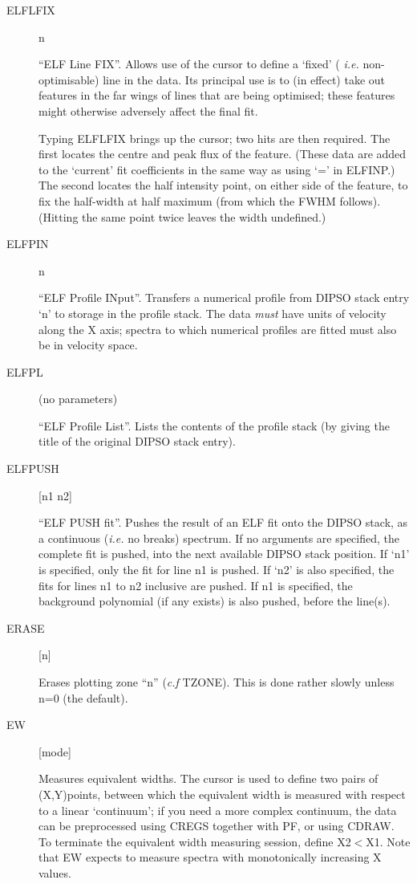 \begin {description}
\item [ELFLFIX] n

``ELF Line FIX''. Allows use of the cursor to define a `fixed' ({\em
i.e.} non-optimisable) line in the data. Its principal use is to (in
effect) take out features in the far wings of lines that are being
optimised; these features might otherwise adversely affect the final
fit.

Typing ELFLFIX brings up the cursor; two hits are then required. The
first locates the centre and peak flux of the feature. (These data are
added to the `current' fit coefficients in the same way as using `='
in ELFINP.) The second locates the half intensity point, on either
side of the feature, to fix the half-width at half maximum (from which
the FWHM follows). (Hitting the same point twice leaves the width
undefined.)

\item [ELFPIN] n

``ELF Profile INput''. Transfers a numerical profile from DIPSO stack
entry `n' to storage in the profile stack. The data {\em must} have
units of velocity along the X axis; spectra to which numerical
profiles are fitted must also be in velocity space.

\item [ELFPL] (no parameters)

``ELF Profile List''. Lists the contents of the profile stack (by
giving the title of the original DIPSO stack entry).

\item [ELFPUSH] [n1 n2]

``ELF PUSH fit''. Pushes the result of an ELF fit onto the DIPSO
stack, as a continuous ({\em i.e.} no breaks) spectrum. If no
arguments are specified, the complete fit is pushed, into the next
available DIPSO stack position. If `n1' is specified, only the fit for
line n1 is pushed. If `n2' is also specified, the fits for lines n1 to
n2 inclusive are pushed. If n1 is specified, the background polynomial
(if any exists) is also pushed, before the line(s).

\item [ERASE] [n]

Erases plotting zone ``n'' ({\it c.f} TZONE). This is done rather slowly
unless n=0 (the default).

\item [EW] [mode]

Measures equivalent widths. The cursor is used to define two pairs of
(X,Y)points, between which the equivalent width is measured with
respect to a linear `continuum'; if you need a more complex continuum,
the data can be preprocessed using CREGS together with PF, or using
CDRAW. To terminate the equivalent width measuring session, define
X2$<$X1. Note that EW expects to measure spectra with monotonically
increasing X values.


\end{description}
